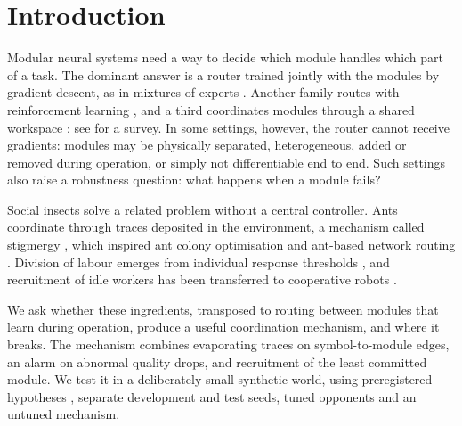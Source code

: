 \documentclass[11pt,a4paper]{article}
\begin{document}
\begin{abstract}
Both preregistered comparisons fail on every confirmatory seed, with a large disadvantage rather than a ceiling tie. The planning gain is therefore confined to Two-rooms among the two tested environments. Task-state error also misranks the Two-rooms predictors; changing CEM final selection fails its criterion. A decoded-position objective comparison stops before planning at decoder feasibility. Code, data, preregistrations, code hashes, seed ledgers and a provenance report are public.
\end{abstract}

\section{Introduction}

Modular neural systems need a way to decide which module handles which part of a task. The dominant answer is a router trained jointly with the modules by gradient descent, as in mixtures of experts \citep{jacobs1991experts,shazeer2017moe}. Another family routes with reinforcement learning \citep{rosenbaum2018routing}, and a third coordinates modules through a shared workspace \citep{goyal2022workspace}; see \citet{pfeiffer2023modular} for a survey. In some settings, however, the router cannot receive gradients: modules may be physically separated, heterogeneous, added or removed during operation, or simply not differentiable end to end. Such settings also raise a robustness question: what happens when a module fails?

Social insects solve a related problem without a central controller. Ants coordinate through traces deposited in the environment, a mechanism called stigmergy \citep{grasse1959}, which inspired ant colony optimisation \citep{dorigo1996antsystem} and ant-based network routing \citep{dicaro1998antnet}. Division of labour emerges from individual response thresholds \citep{bonabeau1996threshold,theraulaz1998reinforcement}, and recruitment of idle workers has been transferred to cooperative robots \citep{krieger2000robots}.

We ask whether these ingredients, transposed to routing between modules that learn during operation, produce a useful coordination mechanism, and where it breaks. The mechanism combines evaporating traces on symbol-to-module edges, an alarm on abnormal quality drops, and recruitment of the least committed module. We test it in a deliberately small synthetic world, using preregistered hypotheses \citep{nosek2018preregistration}, separate development and test seeds, tuned opponents and an untuned mechanism.
\end{document}
